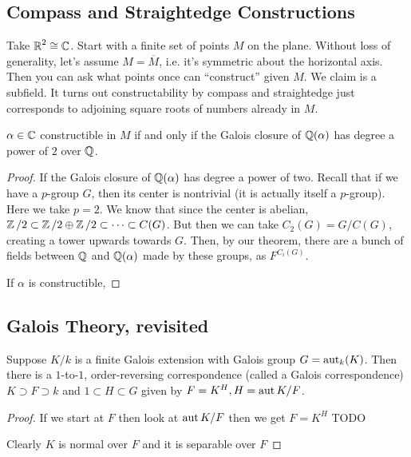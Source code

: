 \subsection{Compass and Straightedge Constructions}
Take $\operatorname{\mathbb{R}}^2 \cong \operatorname{\mathbb{C}}$. Start with a finite set of points $M$
on the plane. Without loss of generality, let's assume $M = \overline{M}$, i.e. it's symmetric about the horizontal axis.
Then you can ask what points once can ``construct'' given $M$. We claim is a subfield.
It turns out
constructability by compass and straightedge just corresponds to
adjoining square roots of numbers already in $M$.

\begin{theorem}
    $\alpha \in \operatorname{\mathbb{C}}$ constructible in $M$ if and only if the Galois
    closure of $\operatorname{\mathbb{Q}}(\alpha)$ has degree a power of $2$ over $\operatorname{\mathbb{Q}}$.
    \begin{proof}
        If the Galois closure of $\operatorname{\mathbb{Q}}(\alpha)$
        has degree a power of two.
        Recall that if we have a $p$-group $G$, then its center is nontrivial
        (it is actually itself a $p$-group). Here we take $p = 2$.
        We know that
        since the center is abelian,
        $\operatorname{\mathbb{Z}}/2 \subset \operatorname{\mathbb{Z}}/2 \oplus \operatorname{\mathbb{Z}}/2 \subset \dots \subset C(G)$.
        But then we can take $C_2(G) = G/C(G)$, creating a tower upwards towards $G$.
        Then, by our theorem, there are a bunch of fields between $\operatorname{\mathbb{Q}}$ and $\operatorname{\mathbb{Q}}(\alpha)$
        made by these groups, as $F^{C_i(G)}$.

        If $\alpha$ is constructible, 
    \end{proof}
\end{theorem}

\subsection{Galois Theory, revisited}
\begin{theorem}
    Suppose $K/k$ is a finite Galois extension with
    Galois group $G = \operatorname{aut}_k(K)$.
    Then there is a $1$-to-$1$, order-reversing
    correspondence (called a Galois correspondence)
    $K \supset F \supset k$ and $1 \subset H \subset G$
    given by $F = K^H, H = \operatorname{aut} K/F$.
    \begin{proof}
        If we start at $F$ then look at $\operatorname{aut} K/F$
        then we get $F = K^H$
        TODO

        Clearly $K$ is normal over $F$ and it is separable over $F$
    \end{proof}
\end{theorem}
